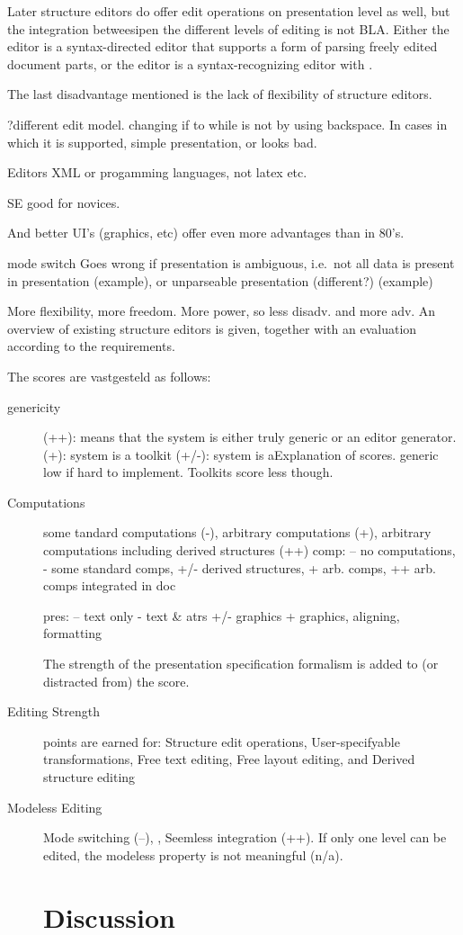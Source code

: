 Later structure editors do offer edit operations on presentation level as well, but the integration betweesipen the different levels of editing is not BLA. Either the editor is a syntax-directed editor that supports a form of parsing freely edited document parts, or the editor is a syntax-recognizing editor with .  



The last disadvantage mentioned is the lack of flexibility of structure editors.  

?different edit model. changing if to while is not by using backspace. In cases in which it is supported, simple presentation, or looks bad.

Editors XML or progamming languages, not latex etc.

SE good for novices.

And better UI's (graphics, etc) offer even more advantages than in 80's. 


mode switch Goes wrong if presentation is ambiguous, i.e.\ not all data is present in presentation (example), or unparseable presentation (different?) (example)


More flexibility, more freedom. More power, so less disadv. and more adv.
 An overview of existing structure editors is given, together with an evaluation according to the requirements. 


The scores are vastgesteld as follows:

\begin{description}
\item[genericity]
(++): means that the system is either truly generic or an editor generator. 
(+): system is a toolkit
(+/-): system is aExplanation of scores.
generic low if hard to implement. Toolkits score less though.

\item[Computations] some tandard computations (-), arbitrary computations (+), arbitrary computations including derived structures (++) 
comp: -- no computations, - some standard comps, +/- derived structures, +  arb. comps, ++ arb. comps integrated in doc

pres: -- text only - text \& atrs +/- graphics + graphics, aligning, formatting
 
The strength of the presentation specification formalism is added to (or distracted from) the score.
\item[Editing Strength] points are earned for: Structure edit operations, User-specifyable transformations, Free text editing, Free layout editing, and Derived structure editing
\item[Modeless Editing] Mode switching (--), , Seemless integration (++). If only one level can be edited, the modeless property is not meaningful (n/a).
\section{Discussion}
\end{description}







